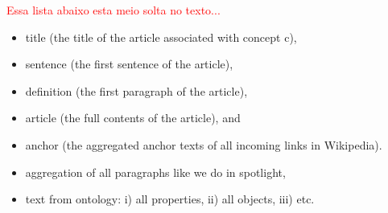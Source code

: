 \documentclass[10pt,a4paper]{article}
\begin{document}
\textcolor{red}{Essa lista abaixo esta meio solta no texto...}
\begin{itemize}
\item title (the title of the article associated with concept c), 
\item sentence (the first sentence of the article),
\item definition (the first paragraph of the article), 
\item article (the full contents of the article), and 
\item anchor (the aggregated anchor texts of all incoming links in Wikipedia).
\item aggregation of all paragraphs like we do in spotlight,
\item text from ontology: i) all properties, ii) all objects, iii) etc.
\end{itemize}



\end{document}
